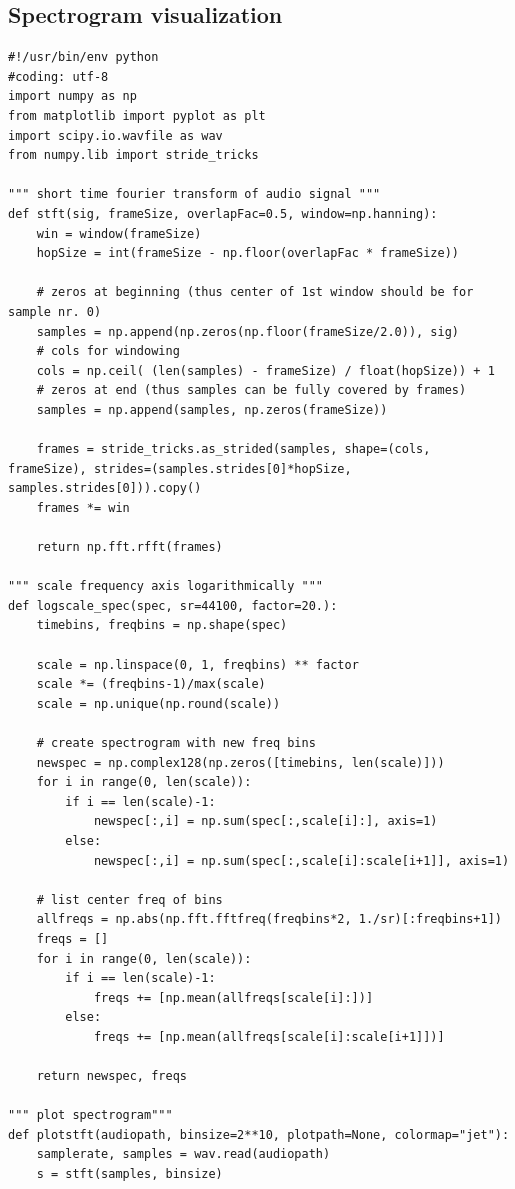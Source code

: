 \documentclass[12pt]{article}
\numberwithin{figure}{section}
\numberwithin{table}{section}
\begin{document}
\subsection{Spectrogram visualization}
\begin{lstlisting}
#!/usr/bin/env python
#coding: utf-8
import numpy as np
from matplotlib import pyplot as plt
import scipy.io.wavfile as wav
from numpy.lib import stride_tricks

""" short time fourier transform of audio signal """
def stft(sig, frameSize, overlapFac=0.5, window=np.hanning):
    win = window(frameSize)
    hopSize = int(frameSize - np.floor(overlapFac * frameSize))
    
    # zeros at beginning (thus center of 1st window should be for sample nr. 0)
    samples = np.append(np.zeros(np.floor(frameSize/2.0)), sig)    
    # cols for windowing
    cols = np.ceil( (len(samples) - frameSize) / float(hopSize)) + 1
    # zeros at end (thus samples can be fully covered by frames)
    samples = np.append(samples, np.zeros(frameSize))
    
    frames = stride_tricks.as_strided(samples, shape=(cols, frameSize), strides=(samples.strides[0]*hopSize, samples.strides[0])).copy()
    frames *= win
    
    return np.fft.rfft(frames)    
    
""" scale frequency axis logarithmically """    
def logscale_spec(spec, sr=44100, factor=20.):
    timebins, freqbins = np.shape(spec)

    scale = np.linspace(0, 1, freqbins) ** factor
    scale *= (freqbins-1)/max(scale)
    scale = np.unique(np.round(scale))
    
    # create spectrogram with new freq bins
    newspec = np.complex128(np.zeros([timebins, len(scale)]))
    for i in range(0, len(scale)):
        if i == len(scale)-1:
            newspec[:,i] = np.sum(spec[:,scale[i]:], axis=1)
        else:        
            newspec[:,i] = np.sum(spec[:,scale[i]:scale[i+1]], axis=1)
    
    # list center freq of bins
    allfreqs = np.abs(np.fft.fftfreq(freqbins*2, 1./sr)[:freqbins+1])
    freqs = []
    for i in range(0, len(scale)):
        if i == len(scale)-1:
            freqs += [np.mean(allfreqs[scale[i]:])]
        else:
            freqs += [np.mean(allfreqs[scale[i]:scale[i+1]])]
    
    return newspec, freqs

""" plot spectrogram"""
def plotstft(audiopath, binsize=2**10, plotpath=None, colormap="jet"):
    samplerate, samples = wav.read(audiopath)
    s = stft(samples, binsize)
    

\end{lstlisting}
\end{document}
